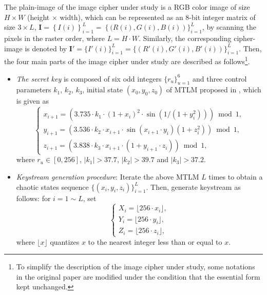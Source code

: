\documentclass{ws-ijbc}
\begin{document}
The plain-image of the image cipher under study is a RGB color image of
size $H\times W$ (height $\times$ width), which can be
represented as an 8-bit integer matrix of size $3\times L$,
$\mathbf{I}=\left\{I(i)\right\}_{i=1}^{L}=\left\{(R(i), G(i), B(i)\right)\}_{i=1}^{L}$, by
scanning the pixels in the raster order, where $L=H\cdot W$.
Similarly, the corresponding cipher-image is denoted by
$\mathbf{I}'=\{I'(i)\}_{i=1}^{L}=\{(R'(i), G'(i), B'(i))\}_{i=1}^{L}$.
Then, the four main parts of the image cipher under study are described as follows\footnote{To simplify the description of the image cipher under study,
some notations in the original paper \cite{Sam:TLM:MTA2012}
are modified under the condition that the essential form kept unchanged.}.
\begin{itemize}
\item
\textit{The secret key} is composed of six odd integers
$\{r_u\}_{u=1}^{6}$ and three control
parameters $k_1$, $k_2$, $k_3$, initial state $(x_0, y_0, z_0)$
of MTLM proposed in
\cite{Sam:TLM:MTA2012}, which is given as
\begin{equation*}
\begin{cases}
x_{i+1}=(3.735\cdot k_1 \cdot (1+x_i)^2 \cdot \sin(1/(1+y_i^2)) )  \bmod{1},         \\
y_{i+1}=(3.536\cdot k_2 \cdot x_{i+1}   \cdot \sin(x_{i+1}\cdot  y_i)  (1+z_i^2) )\bmod{1},    \\
z_{i+1}=(3.838\cdot k_3 \cdot x_{i+1}   \cdot (1 + y_{i+1}\cdot z_i) ) \bmod{1},
\end{cases}
\end{equation*}
where $r_u \in [0, 256]$, $\left|k_1\right|>37.7$, $\left|k_2\right|>39.7$ and $\left|k_3\right| > 37.2$.

\item
\textit{Keystream generation procedure}:
Iterate the above MTLM $L$ times to obtain a chaotic states sequence
$\{(x_i, y_i, z_i)\}_{i=1}^{L}$. Then, generate keystream as follows: for $i=1 \sim L$, set
\begin{equation}
\nonumber
\begin{cases}
X_{i} = \lfloor 256 \cdot x_{i} \rfloor, \\
Y_{i} = \lfloor 256 \cdot y_{i} \rfloor, \\
Z_{i} = \lfloor 256 \cdot z_{i} \rfloor,
\end{cases}
\end{equation}
where $\lfloor x \rfloor$ quantizes $x$ to the nearest integer less than or
equal to $x$.


\end{itemize}
\end{document}
